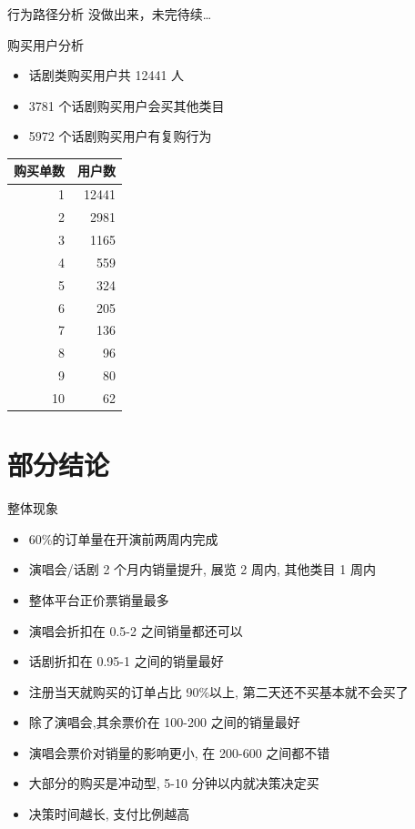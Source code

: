 \documentclass[presentation, bigger]{beamer}
\begin{document}
\begin{frame}[label={sec:org4659708}]{行为路径分析}
\alert{没做出来，未完待续\ldots{}}
\end{frame}
\begin{frame}[label={sec:org1619071}]{购买用户分析}
\begin{itemize}
\item 话剧类购买用户共 12441 人
\item 3781 个话剧购买用户会买其他类目
\item 5972 个话剧购买用户有复购行为
\end{itemize}
\begin{center}
\begin{tabular}{rr}
购买单数 & 用户数\\
\hline
1 & 12441\\
2 & 2981\\
3 & 1165\\
4 & 559\\
5 & 324\\
6 & 205\\
7 & 136\\
8 & 96\\
9 & 80\\
10 & 62\\
\end{tabular}
\end{center}
\end{frame}

\section{部分结论}
\label{sec:orgf3b17fe}
\begin{frame}[allowframebreaks,label=]{整体现象}
\begin{itemize}
\item 60\%的订单量在开演前两周内完成
\item 演唱会/话剧 2 个月内销量提升, 展览 2 周内, 其他类目 1 周内
\item 整体平台正价票销量最多
\item 演唱会折扣在 0.5-2 之间销量都还可以
\item 话剧折扣在 0.95-1 之间的销量最好
\end{itemize}
\framebreak
\begin{itemize}
\item 注册当天就购买的订单占比 90\%以上, 第二天还不买基本就不会买了
\item 除了演唱会,其余票价在 100-200 之间的销量最好
\item 演唱会票价对销量的影响更小, 在 200-600 之间都不错
\item 大部分的购买是冲动型, 5-10 分钟以内就决策决定买
\item 决策时间越长, 支付比例越高
\end{itemize}
\end{frame}
\end{document}
